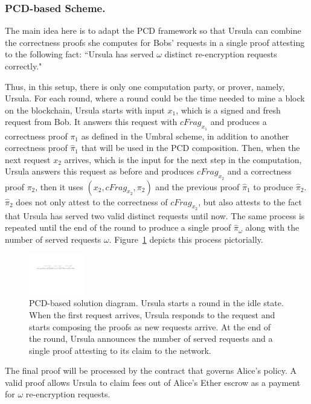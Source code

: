 \subsubsection{PCD-based Scheme.}
The main idea here is to adapt the PCD framework so that Ursula
can combine the correctness proofs she computes for Bobs' requests in a single proof 
attesting to the following fact: ``Ursula has served $\omega$ distinct re-encryption 
requests correctly." 


Thus, in this setup, there is only one computation party, or prover, namely, Ursula. 
For each round, where a round could be the time needed to mine a block on the 
blockchain, Ursula starts with input $x_1$, which is a signed and fresh request
from Bob. It answers this request with $cFrag_{x_1}$ and produces a correctness 
proof $\pi_1$ as defined in the Umbral scheme, in addition to another correctness 
proof $\hat{\pi}_1$ that will be used in the PCD composition. Then, when the next request $x_2$ arrives, 
which is the input for the next step in the computation, Ursula answers 
this request as before and produces $cFrag_{x_2}$ and a correctness proof $\pi_2$, then 
it uses $(x_2, cFrag_{x_2}, \pi_2)$ and the previous proof $\hat{\pi}_1$ to produce $\hat{\pi}_2$. 
$\hat{\pi}_2$ does not only 
attest to the correctness of $cFrag_{x_2}$, but also attests to the fact that Ursula has served 
two valid distinct requests until now. The same process is repeated until the end of the 
round to produce a single proof $\hat{\pi}_{\omega}$ along with the number of 
served requests $\omega$. Figure~\ref{pcd-based-sol} depicts 
this process pictorially.


\begin{figure}[h!]
\centerline{
\includegraphics[height= 0.7in, width = 1.0\columnwidth]{figures/pcd-based-sol.pdf}}
\caption{PCD-based solution diagram. Ursula starts a round in the idle state. When 
the first request arrives, Ursula responds to the request and starts composing the 
proofs as new requests arrive. At the end of the round, Ursula announces the number of 
served requests and a single proof attesting to its claim to the network. }
\label{pcd-based-sol}
\end{figure}


The final proof will be processed by the contract that governs Alice's policy. A valid proof 
allows Ursula to claim fees out of Alice's Ether escrow as a payment for $\omega$ re-encryption  
requests. 



